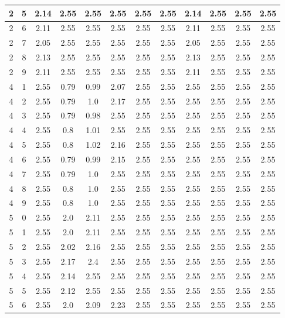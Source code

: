 \begin{longtable}{|c|c||c||c|c|c|c|c||c|c|c|c|}
	2 & 5 & 2.14 & 2.55 & 2.55 & 2.55 & 2.55 & 2.55 & 2.14 & 2.55 & 2.55 & 2.55 \\ \hline
	2 & 6 & 2.11 & 2.55 & 2.55 & 2.55 & 2.55 & 2.55 & 2.11 & 2.55 & 2.55 & 2.55 \\ \hline
	2 & 7 & 2.05 & 2.55 & 2.55 & 2.55 & 2.55 & 2.55 & 2.05 & 2.55 & 2.55 & 2.55 \\ \hline
	2 & 8 & 2.13 & 2.55 & 2.55 & 2.55 & 2.55 & 2.55 & 2.13 & 2.55 & 2.55 & 2.55 \\ \hline
	2 & 9 & 2.11 & 2.55 & 2.55 & 2.55 & 2.55 & 2.55 & 2.11 & 2.55 & 2.55 & 2.55 \\ \hline
	4 & 1 & 2.55 & 0.79 & 0.99 & 2.07 & 2.55 & 2.55 & 2.55 & 2.55 & 2.55 & 2.55 \\ \hline
	4 & 2 & 2.55 & 0.79 & 1.0 & 2.17 & 2.55 & 2.55 & 2.55 & 2.55 & 2.55 & 2.55 \\ \hline
	4 & 3 & 2.55 & 0.79 & 0.98 & 2.55 & 2.55 & 2.55 & 2.55 & 2.55 & 2.55 & 2.55 \\ \hline
	4 & 4 & 2.55 & 0.8 & 1.01 & 2.55 & 2.55 & 2.55 & 2.55 & 2.55 & 2.55 & 2.55 \\ \hline
	4 & 5 & 2.55 & 0.8 & 1.02 & 2.16 & 2.55 & 2.55 & 2.55 & 2.55 & 2.55 & 2.55 \\ \hline
	4 & 6 & 2.55 & 0.79 & 0.99 & 2.15 & 2.55 & 2.55 & 2.55 & 2.55 & 2.55 & 2.55 \\ \hline
	4 & 7 & 2.55 & 0.79 & 1.0 & 2.55 & 2.55 & 2.55 & 2.55 & 2.55 & 2.55 & 2.55 \\ \hline
	4 & 8 & 2.55 & 0.8 & 1.0 & 2.55 & 2.55 & 2.55 & 2.55 & 2.55 & 2.55 & 2.55 \\ \hline
	4 & 9 & 2.55 & 0.8 & 1.0 & 2.55 & 2.55 & 2.55 & 2.55 & 2.55 & 2.55 & 2.55 \\ \hline
	5 & 0 & 2.55 & 2.0 & 2.11 & 2.55 & 2.55 & 2.55 & 2.55 & 2.55 & 2.55 & 2.55 \\ \hline
	5 & 1 & 2.55 & 2.0 & 2.11 & 2.55 & 2.55 & 2.55 & 2.55 & 2.55 & 2.55 & 2.55 \\ \hline
	5 & 2 & 2.55 & 2.02 & 2.16 & 2.55 & 2.55 & 2.55 & 2.55 & 2.55 & 2.55 & 2.55 \\ \hline
	5 & 3 & 2.55 & 2.17 & 2.4 & 2.55 & 2.55 & 2.55 & 2.55 & 2.55 & 2.55 & 2.55 \\ \hline
	5 & 4 & 2.55 & 2.14 & 2.55 & 2.55 & 2.55 & 2.55 & 2.55 & 2.55 & 2.55 & 2.55 \\ \hline
	5 & 5 & 2.55 & 2.12 & 2.55 & 2.55 & 2.55 & 2.55 & 2.55 & 2.55 & 2.55 & 2.55 \\ \hline
	5 & 6 & 2.55 & 2.0 & 2.09 & 2.23 & 2.55 & 2.55 & 2.55 & 2.55 & 2.55 & 2.55 \\ \hline

\end{longtable}
